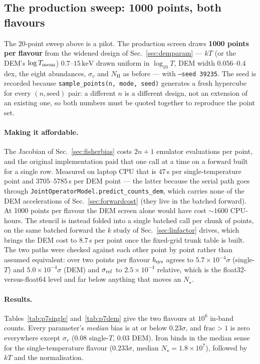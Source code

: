 \documentclass[11pt,a4paper]{article}
\newcommand{\nh}{N_{\mathrm{H}}}
\newcommand{\kev}{\,\mathrm{keV}}
\newcommand{\code}[1]{\texttt{#1}}
\begin{document}
\subsection{The production sweep: 1000 points, both flavours}\label{sec:p7sweep}
The 20-point sweep above is a pilot. The production screen draws
\textbf{1000 points per flavour} from the widened design of
Sec.~\ref{sec:demparam} --- $kT$ (or the DEM's $\log T_{\rm mean}$)
$0.7$--$15\kev$ drawn uniform in $\log_{10}T$, DEM width $0.056$--$0.4$ dex,
the eight abundances, $\sigma_v$ and $\nh$ as before --- with
\code{--seed 39235}. The seed is recorded because
\code{sample\_points(n, mode, seed)} generates a fresh hypercube for every
$(n,\mathrm{seed})$ pair: a different $n$ is a different design, not an
extension of an existing one, so both numbers must be quoted together to
reproduce the point set.

\paragraph{Making it affordable.} The Jacobian of Sec.~\ref{sec:fisherbias}
costs $2n+1$ emulator evaluations per point, and the original implementation
paid that one call at a time on a forward built for a single row. Measured on
laptop CPU that is $47\,$s per single-temperature point and
$3705$--$5785\,$s per DEM point --- the latter because the serial path goes
through \code{JointOperatorModel.predict\_counts\_dem}, which carries none of
the DEM accelerations of Sec.~\ref{sec:forwardcost} (they live in the batched
forward). At 1000 points per flavour the DEM screen alone would have cost
${\sim}1600$ CPU-hours. The stencil is instead folded into a single batched
call per chunk of points, on the same batched forward the $k$ study of
Sec.~\ref{sec:linfactor} drives, which brings the DEM cost to $8.7\,$s per
point once the fixed-grid trunk table is built. The two paths were checked
against each other point by point rather than assumed equivalent: over two
points per flavour $b_{\rm sys}$ agrees to $5.7\times10^{-4}\sigma$
(single-$T$) and $5.0\times10^{-4}\sigma$ (DEM) and $\sigma_{\rm ref}$ to
$2.5\times10^{-4}$ relative, which is the float32-versus-float64 level and far
below anything that moves an $N_\star$.

\paragraph{Results.} Tables~\ref{tab:p7single} and~\ref{tab:p7dem} give the two
flavours at $10^{6}$ in-band counts. Every parameter's \emph{median} bias is at
or below $0.23\sigma$, and $\mathrm{frac}>1$ is zero everywhere except
$\sigma_v$ ($0.08$ single-$T$, $0.03$ DEM). Iron binds in the median sense for
the single-temperature flavour ($0.233\sigma$, median
$N_\star=1.8\times10^{7}$), followed by $kT$ and the normalisation.
\end{document}
